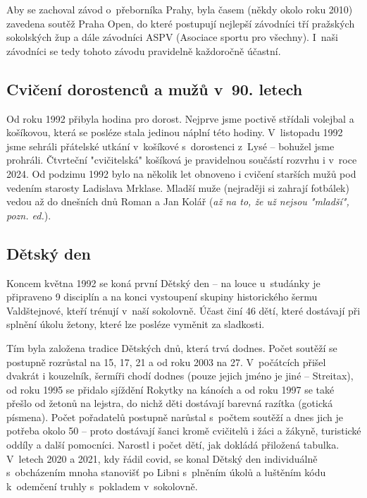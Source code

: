 \documentclass[a5paper, 11pt, twoside]{article}
\begin{document}
Aby se zachoval závod o~přeborníka Prahy, byla časem (někdy okolo roku
2010) zavedena soutěž Praha Open, do které postupují nejlepší závodníci
tří pražských sokolských žup a dále závodníci ASPV (Asociace sportu pro
všechny). I~naši závodníci se tedy tohoto závodu pravidelně každoročně
účastní.

\subsection{Cvičení dorostenců a mužů v~90.
letech}

Od roku 1992 přibyla hodina pro dorost. Nejprve jsme poctivě střídali
volejbal a košíkovou, která se posléze stala jedinou náplní této hodiny.
V~listopadu 1992 jsme sehráli přátelské utkání v~košíkové s~dorostenci
z~Lysé -- bohužel jsme prohráli. Čtvrteční "cvičitelská" košíková je
pravidelnou součástí rozvrhu i v~roce 2024. Od podzimu 1992 bylo na
několik let obnoveno i cvičení starších mužů pod vedením starosty
Ladislava Mrklase. Mladší muže (nejraději si zahrají fotbálek) vedou až
do dnešních dnů Roman a Jan Kolář (\textit{až na to, že už nejsou
"mladší", pozn. ed.}).

\subsection{Dětský den}

Koncem května 1992 se koná první Dětský den -- na louce u~studánky je
připraveno 9 disciplín a na konci vystoupení skupiny historického šermu
Valdštejnové, kteří trénují v~naší sokolovně. Účast činí 46 dětí, které
dostávají při splnění úkolu žetony, které lze posléze vyměnit za
sladkosti.

Tím byla založena tradice Dětských dnů, která trvá dodnes. Počet soutěží
se postupně rozrůstal na 15, 17, 21 a od roku 2003 na 27. V~počátcích
přišel dvakrát i kouzelník, šermíři chodí dodnes (pouze jejich jméno je
jiné -- Streitax), od roku 1995 se přidalo sjíždění Rokytky na kánoích a
od roku 1997 se také přešlo od žetonů na lejstra, do nichž děti
dostávají barevná razítka (gotická písmena). Počet pořadatelů postupně
narůstal s~počtem soutěží a dnes jich je potřeba okolo 50 -- proto
dostávají šanci kromě cvičitelů i žáci a žákyně, turistické oddíly a
další pomocníci. Narostl i počet dětí, jak dokládá přiložená
tabulka. V~letech 2020 a 2021, kdy řádil covid, se konal Dětský den
individuálně s~obcházením mnoha stanovišť po Libni s~plněním úkolů a
luštěním kódu k~odemčení truhly s~pokladem v~sokolovně.
\end{document}
